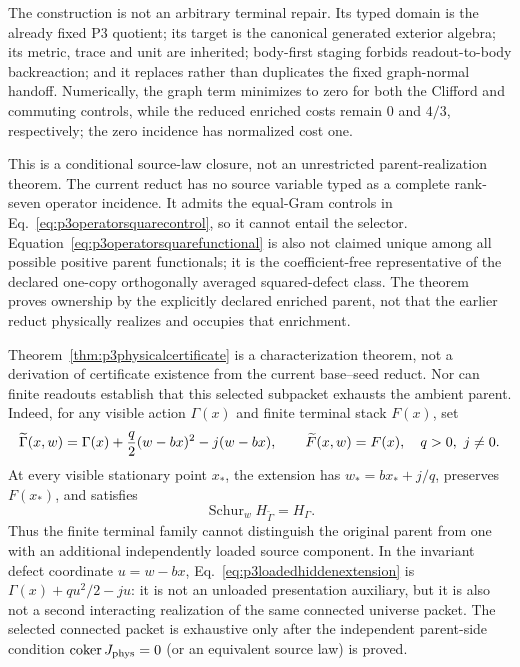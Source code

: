 The construction is not an arbitrary terminal repair.  Its typed domain is
the already fixed P3 quotient; its target is the canonical generated exterior
algebra; its metric, trace and unit are inherited; body-first staging forbids
readout-to-body backreaction; and it replaces rather than duplicates the
fixed graph-normal handoff.  Numerically, the graph term minimizes to zero
for both the Clifford and commuting controls, while the reduced enriched
costs remain $0$ and $4/3$, respectively; the zero incidence has normalized
cost one.

This is a conditional source-law closure, not an unrestricted
parent-realization theorem.
The current reduct has no source variable typed as a complete rank-seven
operator incidence.  It admits the equal-Gram controls in
Eq.~\eqref{eq:p3operatorsquarecontrol}, so it cannot entail the selector.
Equation~\eqref{eq:p3operatorsquarefunctional} is also not claimed unique
among all possible positive parent functionals; it is the coefficient-free
representative of the declared one-copy orthogonally averaged squared-defect
class.  The theorem proves ownership by the explicitly declared enriched
parent, not that the earlier reduct physically realizes and occupies that
enrichment.

Theorem~\ref{thm:p3physicalcertificate} is a characterization theorem, not a
derivation of certificate existence from the current base--seed reduct.  Nor
can finite readouts establish that this selected subpacket exhausts the
ambient parent.  Indeed, for any visible action $\Gamma(x)$ and finite
terminal stack $F(x)$, set
\begin{equation}
 \widetilde\Gamma(x,w)=\Gamma(x)
 +{q\over2}(w-bx)^2-j(w-bx),\qquad
 \widetilde F(x,w)=F(x),
 \quad q>0,\ j\ne0.
 \label{eq:p3loadedhiddenextension}
\end{equation}
At every visible stationary point $x_*$, the extension has
$w_*=bx_*+j/q$, preserves $F(x_*)$, and satisfies
\begin{equation}
 \operatorname{Schur}_w H_{\widetilde\Gamma}=H_\Gamma.
 \label{eq:p3loadedhiddenschur}
\end{equation}
Thus the finite terminal family cannot distinguish the original parent from
one with an additional independently loaded source component.  In the
invariant defect coordinate $u=w-bx$, Eq.~\eqref{eq:p3loadedhiddenextension}
is $\Gamma(x)+qu^2/2-ju$: it is not an unloaded presentation auxiliary, but
it is also not a second interacting realization of the same connected
universe packet.  The selected connected packet is exhaustive only after the
independent parent-side condition
$\operatorname{coker}J_{\rm phys}=0$ (or an equivalent source law) is proved.

